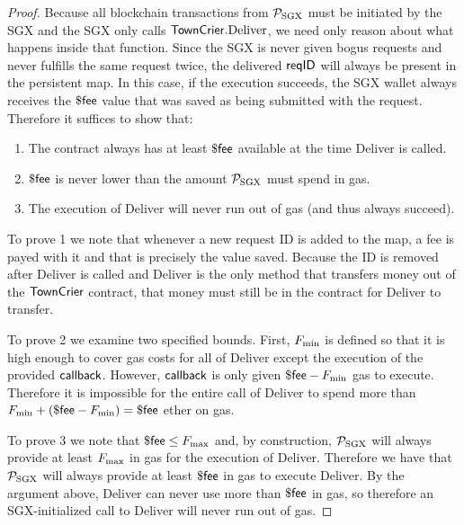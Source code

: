 \begin{proof}

Because all blockchain transactions from $\mathcal{P}_{\rm SGX}$ must be initiated by the SGX and the SGX only calls ${\sf TownCrier}.{\rm Deliver}$,
we need only reason about what happens inside that function.
Since the SGX is never given bogus requests and never fulfills the same request twice,
the delivered ${\sf reqID}$ will always be present in the persistent map.
In this case, if the execution succeeds, the SGX wallet always receives the $\${\sf fee}$ value that was saved as being submitted with the request.
Therefore it suffices to show that:
\begin{enumerate}
  \item The contract always has at least $\${\sf fee}$ available at the time Deliver is called.
  \item $\${\sf fee}$ is never lower than the amount $\mathcal{P}_{\rm SGX}$ must spend in gas.
  \item The execution of Deliver will never run out of gas (and thus always succeed).
\end{enumerate}

To prove 1 we note that whenever a new request ID is added to the map, a fee is payed with it and that is precisely the value saved.
Because the ID is removed after Deliver is called and Deliver is the only method that transfers money out of the ${\sf TownCrier}$ contract,
that money must still be in the contract for Deliver to transfer.

To prove 2 we examine two specified bounds.
First, $F_{\rm min}$ is defined so that it is high enough to cover gas costs for all of Deliver except the execution of the provided ${\sf callback}$.
However, ${\sf callback}$ is only given $\${\sf fee} - F_{\rm min}$ gas to execute.
Therefore it is impossible for the entire call of Deliver to spend more than $F_{\rm min} + (\${\sf fee} - F_{\rm min}) = \${\sf fee}$ ether on gas.

To prove 3 we note that $\${\sf fee} \leq F_{\rm max}$ and, by construction, $\mathcal{P}_{\rm SGX}$ will always provide at least
$F_{\rm max}$ in gas for the execution of Deliver.
Therefore we have that $\mathcal{P}_{\rm SGX}$ will always provide at least $\${\sf fee}$ in gas to execute Deliver.
By the argument above, Deliver can never use more than $\${\sf fee}$ in gas, so therefore an SGX-initialized call to Deliver will never run out of gas.
\end{proof}

